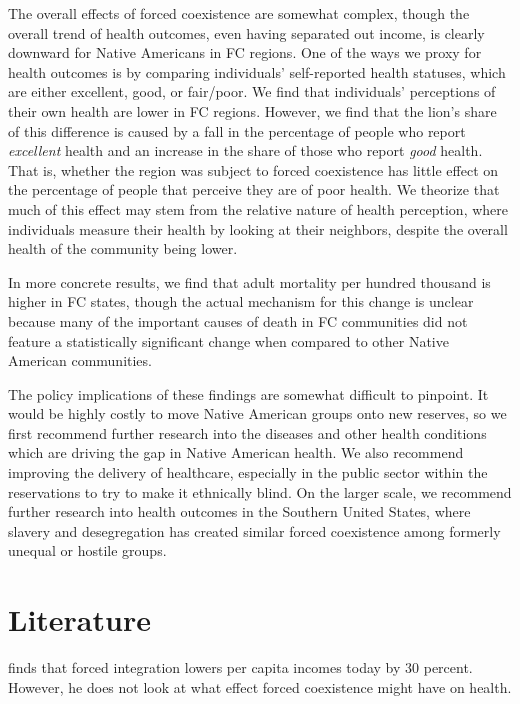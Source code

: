 \documentclass[12pt]{article}
\begin{document}
The overall effects of forced coexistence are somewhat complex, though the overall trend of health outcomes, even having separated out income, is clearly downward for Native Americans in FC regions. 
One of the ways we proxy for health outcomes is by comparing individuals' self-reported health statuses, which are either excellent, good, or fair/poor.
We find that individuals' perceptions of their own health are lower in FC regions. 
However, we find that the lion's share of this difference is caused by a fall in the percentage of people who report \emph{excellent} health and an increase in the share of those who report \emph{good} health.
That is, whether the region was subject to forced coexistence has little effect on the percentage of people that perceive they are of poor health. 
We theorize that much of this effect may stem from the relative nature of health perception, where individuals measure their health by looking at their neighbors, despite the overall health of the community being lower.

In more concrete results, we find that adult mortality per hundred thousand is higher in FC states, though the actual mechanism for this change is unclear because many of the important causes of death in FC communities did not feature a statistically significant change when compared to other Native American communities.

The policy implications of these findings are somewhat difficult to pinpoint.  
It would be highly costly to move Native American groups onto new reserves, so we first recommend further research into the diseases and other health conditions which are driving the gap in Native American health. 
We also recommend improving the delivery of healthcare, especially in the public sector within the reservations to try to make it ethnically blind. 
On the larger scale, we recommend further research into health outcomes in the Southern United States, where slavery and desegregation has created similar forced coexistence among formerly unequal or hostile groups.  


\section{Literature}
\cite{dippel2010forced} finds that forced integration lowers per capita incomes today by 30 percent. However, he does not look at what effect forced coexistence might have on health.
\end{document}
